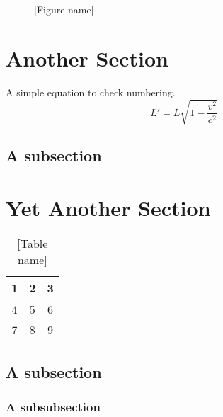 \begin{figure}
\framebox[\textwidth]{\parbox{\textwidth}{\lipsum[1]}} %
\caption[{[Alternate short name]}]{[Figure name]}
\end{figure}

\section{Another Section}
A simple equation to check numbering.
\begin{equation}
L' = {L}{\sqrt{1-\frac{v^2}{c^2}}}
\end{equation}
\lipsum[2-3] %

\subsection{A subsection}
\lipsum[5-6] %

\section{Yet Another Section}
\lipsum[1] %
\begin{table}
\begin{center}
\begin{tabular}{ | c | c | c | }
\hline
  1 & 2 & 3 \\ \hline\hline
  4 & 5 & 6 \\
  7 & 8 & 9 \\
\hline
\end{tabular}\vspace{-1em}%
\end{center}
\caption{[Table name]}
\end{table}
\lipsum[2]

\subsection{A subsection}\label{sec:another}
\lipsum[3]

\subsubsection{A subsubsection}\label{sec:minorstuff}
\lipsum[4]


